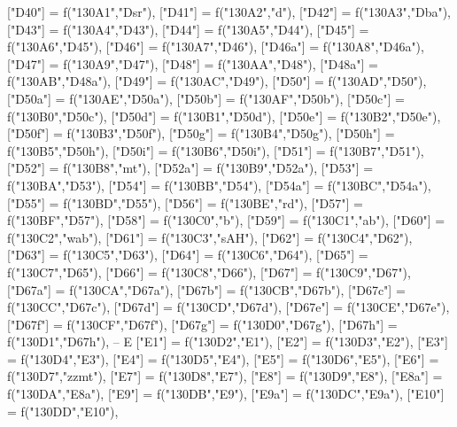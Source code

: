 \documentclass{article}
\begin{document}
\begin{luacode*}
{	["D40"] = f("130A1","Dsr"),
	["D41"] = f("130A2","d"),
	["D42"] = f("130A3","Dba"),
	["D43"] = f("130A4","D43"),
	["D44"] = f("130A5","D44"),
	["D45"] = f("130A6","D45"),
	["D46"] = f("130A7","D46"),
	["D46a"] = f("130A8","D46a"),
	["D47"] = f("130A9","D47"),
	["D48"] = f("130AA","D48"),
	["D48a"] = f("130AB","D48a"),
	["D49"] = f("130AC","D49"),
	["D50"] = f("130AD","D50"),
	["D50a"] = f("130AE","D50a"),
	["D50b"] = f("130AF","D50b"),
	["D50c"] = f("130B0","D50c"),
	["D50d"] = f("130B1","D50d"),
	["D50e"] = f("130B2","D50e"),
	["D50f"] = f("130B3","D50f"),
	["D50g"] = f("130B4","D50g"),
	["D50h"] = f("130B5","D50h"),
	["D50i"] = f("130B6","D50i"),
	["D51"] = f("130B7","D51"),
	["D52"] = f("130B8","mt"),
	["D52a"] = f("130B9","D52a"),
	["D53"] = f("130BA","D53"),
	["D54"] = f("130BB","D54"),
	["D54a"] = f("130BC","D54a"),
	["D55"] = f("130BD","D55"),
	["D56"] = f("130BE","rd"),
	["D57"] = f("130BF","D57"),
	["D58"] = f("130C0","b"),
	["D59"] = f("130C1","ab"),
	["D60"] = f("130C2","wab"),
	["D61"] = f("130C3","sAH"),
	["D62"] = f("130C4","D62"),
	["D63"] = f("130C5","D63"),
	["D64"] = f("130C6","D64"),
	["D65"] = f("130C7","D65"),
	["D66"] = f("130C8","D66"),
	["D67"] = f("130C9","D67"),
	["D67a"] = f("130CA","D67a"),
	["D67b"] = f("130CB","D67b"),
	["D67c"] = f("130CC","D67c"),
	["D67d"] = f("130CD","D67d"),
	["D67e"] = f("130CE","D67e"),
	["D67f"] = f("130CF","D67f"),
	["D67g"] = f("130D0","D67g"),
	["D67h"] = f("130D1","D67h"),
-- E 
   ["E1"] = f("130D2","E1"),
   ["E2"] = f("130D3","E2"),
   ["E3"] = f("130D4","E3"),
   ["E4"] = f("130D5","E4"),
   ["E5"] = f("130D6","E5"),
	["E6"] = f("130D7","zzmt"),
   ["E7"] = f("130D8","E7"),
   ["E8"] = f("130D9","E8"),
   ["E8a"] = f("130DA","E8a"),
   ["E9"] = f("130DB","E9"),
   ["E9a"] = f("130DC","E9a"),
   ["E10"] = f("130DD","E10"),

}
\end{luacode*}
\end{document}
